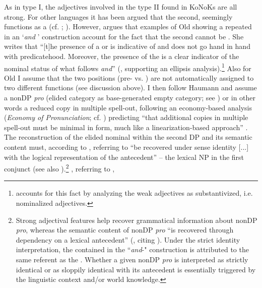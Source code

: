 \documentclass[output=paper,colorlinks,citecolor=brown]{langscibook}
\begin{document}
As in type I, the adjectives involved in the type II 
found in KoNoKs are all strong. For other languages it has been argued
that the second, seemingly   functions as a
  (cf. \citealp{Spamer1979}; \citealp[171, 176]{Fischer00}). However,
\citet[64f]{Haumann03} argues that examples of Old  showing a
  repeated in an `\emph{and} ' construction
account for the fact that the second  cannot be .
She writes that ``{[}t{]}he presence of a  or
 is indicative of  and  does
not go hand in hand with predicatehood. Moreover, the presence of the
  is a clear indicator of the nominal status of what
follows \emph{and}'' (\citealp[65]{Haumann03}, supporting an ellipsis analysis).\footnote{\citet[176]{Fischer00} accounts for this fact by analyzing the weak adjectives as
  substantivized, i.e. nominalized adjectives.} Also for Old  I
assume that the two positions (pre- vs. ) are not
automatically assigned to two different functions (see discussion
above). I then follow Haumann and assume a nonDP \emph{pro} (elided
category as base-generated empty category; see \citealp{Lobeck1995}) or in other
words a reduced copy in multiple spell-out, following an economy-based
analysis (\emph{Economy of Pronunciation}; cf. \citealp{vanUrk2018}) predicting
``that additional copies in multiple spell-out must be minimal in form,
much like a linearization-based approach'' \citep[965]{vanUrk2018}. The
reconstruction of the elided nominal within the second DP and its
semantic content must, according to \citet[76]{Haumann03}, referring to
\citet[786f.]{Lobeck1993} ``be recovered under sense identity {[}...{]} with
the logical representation of the antecedent'' -- the lexical NP in the
first conjunct (see also \citealp[966]{vanUrk2018}).\footnote{Strong adjectival
   features help recover grammatical information about nonDP
  \emph{pro}, whereas the semantic content of nonDP \emph{pro} ``is
  recovered through dependency on a lexical antecedent'' (\citealp[74]{Haumann03}, citing \citealp[193]{Kester1996thesis}). Under the strict identity
  interpretation, the  contained in the 
  ``\emph{and}-" construction is attributed to the same
  referent as the  . Whether a given nonDP \emph{pro}
  is interpreted as strictly identical or as sloppily identical with its
  antecedent is essentially triggered by the linguistic context and/or
  world knowledge.} \citet[66]{Haumann03}, referring to \citet[187ff]{Kester1996thesis}, 
\end{document}
